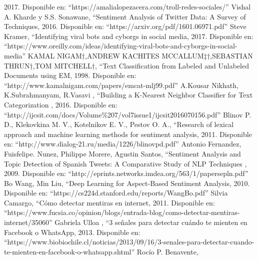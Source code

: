 \documentclass[../all.tex]{subfiles}
\begin{document}
\begin{thebibliography}{37}
		2017.
		Disponible en: ``https://amalialopezacera.com/troll-redes-sociales/''
		Vishal A. Kharde y S.S. Sonawane, 
		\textquotedblleft Sentiment Analysis of Twitter Data: A Survey of Techniques,
		2016.
		Disponible en: ``https://arxiv.org/pdf/1601.06971.pdf''
		 Steve Kramer, 
		\textquotedblleft Identifying viral bots and cyborgs in social media,
		2017.
		Disponible en: ``https://www.oreilly.com/ideas/identifying-viral-bots-and-cyborgs-in-social-media''
		KAMAL NIGAM†,ANDREW KACHITES MCCALLUM‡†,SEBASTIAN THRUN†,TOM MITCHELL†, 
		\textquotedblleft Text Classification from Labeled and Unlabeled
		Documents using EM,
		1998.
		Disponible en: ``http://www.kamalnigam.com/papers/emcat-mlj99.pdf''
		A.Kousar Nikhath, K.Subrahmanyam, R.Vasavi , 
		\textquotedblleft Building a K-Nearest Neighbor Classifier for Text Categorization ,
		2016.
		Disponible en: ``http://ijcsit.com/docs/Volume\%207/vol7issue1/ijcsit2016070156.pdf''
		Blinov P. D., Klekovkina M. V., Kotelnikov E. V., Pestov O. A., 
		\textquotedblleft Research of lexical approach and machine learning methods for sentiment analysis,
		2011.
		Disponible en: ``http://www.dialog-21.ru/media/1226/blinovpd.pdf''
		Antonio Fernandez, Fuisfelipe. Nunez, Philippe Morere, Agustin Santos, 
		\textquotedblleft Sentiment Analysis and Topic Detection of Spanish Tweets: A Comparative Study of NLP Techniques ,
		2009.
		Disponible en: ``http://eprints.networks.imdea.org/563/1/papersepln.pdf''
		Bo Wang, Min Liu, 
		\textquotedblleft Deep Learning for Aspect-Based Sentiment Analysis,
		2010.
		Disponible en: ``https://cs224d.stanford.edu/reports/WangBo.pdf''
		Silvia Camargo, 
		\textquotedblleft Cómo detectar mentiras en internet,
		2011.
		Disponible en: ``https://www.fucsia.co/opinion/blogs/entrada-blog/como-detectar-mentiras-internet/35060''
		Gabriela Ulloa , 
		\textquotedblleft 3 señales para detectar cuándo te mienten en Facebook o WhatsApp,
		2013.
		Disponible en: ``https://www.biobiochile.cl/noticias/2013/09/16/3-senales-para-detectar-cuando-te-mienten-en-facebook-o-whatsapp.shtml''
		Rocío P. Benavente, 

\end{thebibliography}
\end{document}
